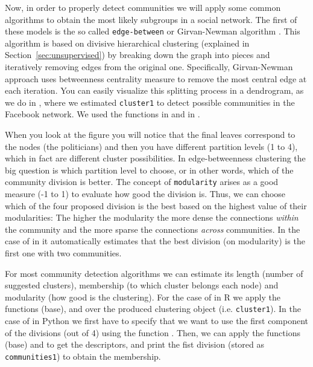 
Now, in order to properly detect communities we will apply some common algorithms to obtain the most likely subgroups in a social network. The first of these models is the so called \texttt{edge-between} or Girvan-Newman algorithm \citep{newman2004finding}. This algorithm is based on divisive hierarchical clustering (explained in Section~\ref{sec:unsupervised}) by breaking down the graph into pieces and iteratively removing edges from the original one. Specifically,  Girvan-Newman approach uses betweenness centrality measure to remove the most central edge at each iteration. You can easily visualize this splitting process in a dendrogram, as we do in , where we estimated \texttt{cluster1} to detect possible communities in the Facebook network. We used the functions  in  and  in .


When you look at the figure you will notice that the final leaves correspond to the nodes (the politicians) and then you have different partition levels (1 to 4), which in fact are different cluster possibilities. In edge-betweenness clustering the big question is which partition level to choose, or in other words, which of the community division is better. The concept of \texttt{modularity} arises as a good measure (-1 to 1) to evaluate how good the division is. Thus, we can choose which of the four proposed division is the best based on the highest value of their modularities: The higher the modularity the more dense the connections \textit{within} the community and the more sparse the connections \textit{across} communities. In the case of  in  it automatically estimates that the best division (on modularity) is the first one with two communities.


For most community detection algorithms we can estimate its length (number of suggested clusters), membership (to which cluster belongs each node) and modularity (how good is the clustering). For the case of  in R we apply the functions  (base),  and  over the produced clustering object (i.e. \texttt{cluster1}). In the case of  in Python we first have to specify that we want to use the first component of the divisions (out of 4) using the function . Then, we can apply the functions  (base) and  to get the descriptors, and print the fist division (stored as \texttt{communities1}) to obtain the membership.

